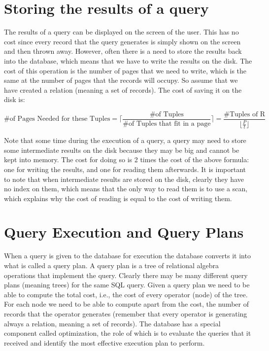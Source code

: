 \documentclass[12pt]{article}
\begin{document}
\section{Storing the results of a query}
The results of a query can be displayed on the screen of the user. This has no cost since every record that the query generates is simply shown on the screen and then thrown away. However, often there is a need to store the results back into the database, which means that we have to write the results on the disk. The cost of this operation is the number of pages that we need to write, which is the same at the number of pages that the records will occupy. So assume that we have created a relation (meaning a set of records). The cost of saving it on the disk is:

$$
\text{\# of Pages Needed for these Tuples} = \Big\lceil\frac{\text{\# of Tuples}}{\text{\# of Tuples that fit in a page}}\Big\rceil = \frac{\text{\#Tuples of R}}{\lfloor\frac{P}{t}\rfloor}
$$

Note that some time during the execution of a query, a query may need to store some intermediate results on the disk because they may be big and cannot be kept into memory. The cost for doing so is 2 times the cost of the above formula: one for writing the results, and one for reading them afterwards.
It is important to note that when intermediate results are stored on the disk, clearly they have no index on them, which means that the only way to read them is to use a scan, which explains why the cost of reading is equal to the cost of writing them.

\section{Query Execution and Query Plans}

When a query is given to the database for execution the database converts it into what is called a query plan. A query plan is a tree of relational algebra operations that implement the query. Clearly there may be many different query plans (meaning trees) for the same SQL query. Given a query plan we need to be able to compute the total cost, i.e., the cost of every operator (node) of the tree. For each node we need to be able to compute apart from the cost, the number of records that the operator generates (remember that every operator is generating always a relation, meaning a set of records).
The database has a special component called optimization, the role of which is to evaluate the queries that it received and identify the most effective execution plan to perform.
\end{document}
